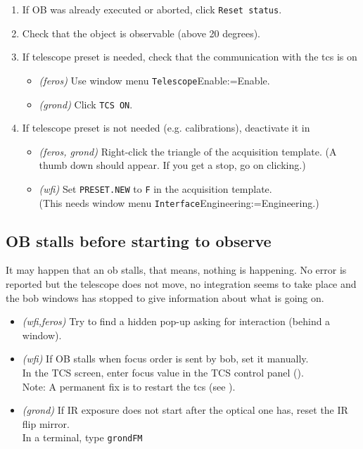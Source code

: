 \documentclass[11pt,fleqn,a4paper]{book}
\makeatletter
\def\menu#1#2{\texttt{#1}\ifx{}#2\else\@for\@x:=#2\do{$\rightarrow$\texttt{\@x}}\fi}
\def\wmenu#1#2{window menu \menu{#1}{#2}}
\makeatother
\begin{document}
\begin{enumerate}
  \item If OB was already executed or aborted, click \texttt{Reset status}. 
  \item Check that the object is observable (above 20 degrees).
  \item If telescope preset is needed, check that the communication with the \gls{tcs} is on
    \begin{itemize}
       \item \textit{(\gls{feros})} Use \wmenu{Telescope}{Enable}.
       \item \textit{(\gls{grond})} Click \texttt{TCS ON}.
    \end{itemize}
  \item If telescope preset is not needed (e.g. calibrations), deactivate it in 
    \begin{itemize}
      \item \textit{(\gls{feros}, \gls{grond})} Right-click the triangle of the \gls{acquisition} \gls{template}.
                   (A thumb down should appear.  If you get a stop, go on clicking.)
      \item \textit{(\gls{wfi})} Set \texttt{PRESET.NEW} to \texttt{F} in the \gls{acquisition} \gls{template}.\\
         (This needs \wmenu{Interface}{Engineering}.) 
    \end{itemize}
\end{enumerate}

\subsection{OB stalls before starting to observe}

It may happen that an \gls{ob} \gls{stall}s, that means, nothing is happening.  No error is reported but the telescope does not move, no integration seems to take place and the \gls{bob} windows has stopped to give information about what is going on.

\begin{itemize}
\item \textit{(\gls{wfi},\gls{feros})} Try to find a hidden pop-up asking for interaction (behind a window).
\item \textit{(\gls{wfi})} If OB stalls when \gls{focus} order is sent by \gls{bob},
set it manually.\\
In the TCS screen, enter \gls{focus} value in the \gls{TCS control panel} ().\\
Note: A permanent fix is to restart the \gls{tcs} (see ).
\item \textit{(\gls{grond})} If IR exposure does not start after the optical one has, reset the IR \gls{flip mirror}.\\
In a terminal, type \texttt{\gls{grondFM}}
\end{itemize}
\end{document}
